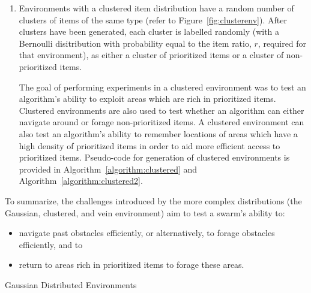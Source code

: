 \begin{enumerate}
\item Environments with a clustered item distribution have a random number of clusters of items of the same type (refer to Figure~\ref{fig:clusterenv}). After clusters have been generated, each cluster is labelled randomly (with a Bernoulli disitribution with probability equal to the item ratio, $r$, required for that environment), as either a cluster of prioritized items or a cluster of non-prioritized items.

The goal of performing experiments in a clustered environment was to test an algorithm's ability to exploit areas which are rich in prioritized items. Clustered environments are also used to test whether an algorithm can either navigate around or forage non-prioritized items. A clustered environment can also test an algorithm's ability to remember locations of areas which have a high density of prioritized items in order to aid more efficient access to prioritized items.  Pseudo-code for generation of clustered environments is provided in Algorithm~\ref{algorithm:clustered} and Algorithm~\ref{algorithm:clustered2}.


\end{enumerate} 

To summarize, the challenges introduced by the more complex distributions (the Gaussian, clustered, and vein environment) aim to test a swarm's ability to:

\begin{itemize}
\item navigate past obstacles efficiently, or alternatively, to forage obstacles efficiently, and to
\item return to areas rich in prioritized items to forage these areas.
\end{itemize}



\begin{algorithm}
\caption{Gaussian Distributed Environments}
\label{algorithm:gaussian}
\begin{algorithmic}[1]
	\State {}
	\State {}
	\State {}
	\State {}
		\State {}
		\State {}
			\State {}
			\State {}
		\EndIf
	\EndWhile

		\State {}
		\State {}
			\State {}
			\State {}
		\EndIf
	\EndWhile
\EndFunction
\end{algorithmic}
\end{algorithm}


